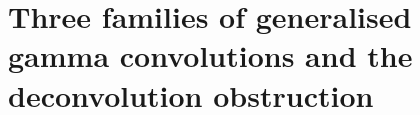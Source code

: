 \chapter{Three families of generalised gamma convolutions and the deconvolution obstruction}\label{vol2:ch7}





